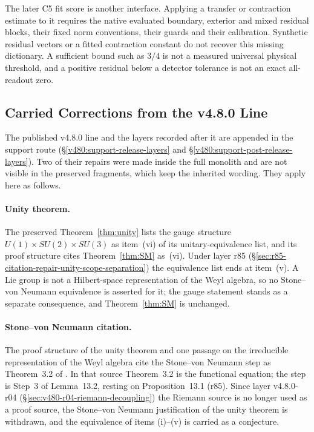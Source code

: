 The later C5 fit score is another interface. Applying a transfer or
contraction estimate to it requires the native evaluated boundary,
exterior and mixed residual blocks, their fixed norm conventions,
their guards and their calibration. Synthetic residual vectors or a
fitted contraction constant do not recover this missing dictionary.
A sufficient bound such as $3/4$ is not a measured universal physical
threshold, and a positive residual below a detector tolerance is not
an exact all-readout zero.

\subsection{Carried Corrections from the v4.8.0 Line}
\label{v480:carried-corrections}

The published v4.8.0 line and the layers recorded after it are appended
in the support route (\S\ref{v480:support-release-layers} and
\S\ref{v480:support-post-release-layers}). Two of their repairs were
made inside the full monolith and are not visible in the preserved
fragments, which keep the inherited wording. They apply here as follows.

\paragraph{Unity theorem.}
The preserved Theorem~\ref{thm:unity} lists the gauge structure
$U(1)\times SU(2)\times SU(3)$ as item~(vi) of its unitary-equivalence
list, and its proof structure cites Theorem~\ref{thm:SM} as~(vi).
Under layer r85 (\S\ref{sec:r85-citation-repair-unity-scope-separation})
the equivalence list ends at item~(v). A Lie group is not a Hilbert-space
representation of the Weyl algebra, so no Stone--von Neumann equivalence
is asserted for it; the gauge statement stands as a separate consequence,
and Theorem~\ref{thm:SM} is unchanged.

\paragraph{Stone--von Neumann citation.}
The proof structure of the unity theorem and one passage on the
irreducible representation of the Weyl algebra cite the Stone--von Neumann step as Theorem~3.2 of
\cite{brendecke2026rh}. In that source Theorem~3.2 is the functional
equation; the step is Step~3 of Lemma~13.2, resting on Proposition~13.1
(r85). Since layer v4.8.0-r04
(\S\ref{sec:v480-r04-riemann-decoupling}) the Riemann source is no longer
used as a proof source, the Stone--von Neumann justification of the unity
theorem is withdrawn, and the equivalence of items (i)--(v) is carried as
a conjecture.

